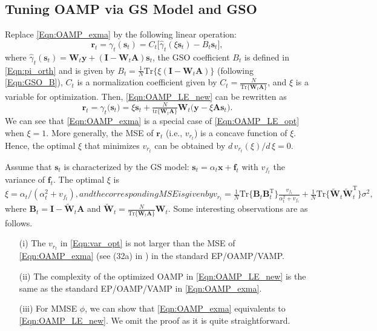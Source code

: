 \documentclass[journal]{IEEEtran}
\newcommand{\mr}{\mathrm}
\newcommand{\BE}{\begin{equation}}
\newcommand{\EE}{\end{equation}}
\newcommand{\BS}{\begin{subequations}}
\newcommand{\ES}{\end{subequations}}
\renewcommand{\bf}{\bm}
\begin{document}
{\color{black}\subsection{Tuning OAMP via GS Model and GSO} 
Replace \eqref{Eqn:OAMP_exma} by the following linear operation:
\BE\label{Eqn:OAMP_LE_new}
  \bf{{r}}_t={\gamma}_t(\bf{{s}}_t) = C_t\big[\hat{\gamma}_t( \xi\bf{{s}}_t) -  B_t \bf{{s}}_t\big], 
\EE
where $ \hat{\gamma}_t(\bf{{s}}_t)=\bf{W}_{\!t}\bf{y} + (\bf{I} - \bf{W}_{\!t}\bf{A})\bf{s}_t$, the GSO coefficient $B_t$ is defined in \eqref{Eqn:pi_orth} and is given by $B_t=\tfrac{1}{N}{\mr{Tr}\{\xi (\bf{I} - \bf{{W}}_t\bf{A})\}}$ (following \eqref{Eqn:GSO_B}), $C_t$ is a normalization coefficient given by $ C_t= \tfrac{N}{\mr{Tr}\{\bf{{W}}_t\bf{A}\}}$, and $\xi$ is a variable for optimization. Then, \eqref{Eqn:OAMP_LE_new} can be rewritten as
\BE\label{Eqn:OAMP_LE_opt}
\bf{{r}}_t={\gamma}_t\big(\bf{{s}}_t)=\xi\bf{{s}}_t+ \tfrac{N}{\mr{tr}\{\bf{{W}}_t\bf{A}\}}{\bf{W}}_t(\bf{y}-\xi\bf{A}\bf{{s}}_t\big).
\EE
 We can see that \eqref{Eqn:OAMP_exma} is a special case of \eqref{Eqn:OAMP_LE_opt} when $\xi=1$. More generally, the MSE of $\bf{{r}}_t$ (i.e., $v_{r_t}$) is a concave function of $\xi$. Hence, the optimal $\xi$ that minimizes $v_{r_t}$ can be obtained by $d\,v_{r_t}(\xi)/d\,\xi=0$. 

Assume that ${\bm s}_t$ is characterized by the GS model: ${\bm s}_t={\alpha_t}{\bm x}+{\bm f}_t$ with $v_{f_t}$ the variance of ${\bm f}_t$. The optimal $\xi$ is
\BS\BE
\xi= \alpha_t/(\alpha_t^2+v_{f_t}),
\EE
and the corresponding MSE is given by
\BE\label{Eqn:var_opt}
v_{r_t} = \tfrac{1}{N}\mr{Tr}\{\bf{B}_t\bf{B}_t^{\mr{T}}\}\tfrac{v_{f_t}}{\alpha_t^2+v_{f_t}}  +\tfrac{1}{N}\mr{Tr}\{\tilde{\bf{W}}_t\tilde{\bf{W}}_t^{\mr{T}}\}\sigma^2,
\EE\ES
where $\bf{B}_t=\bf{I}-\tilde{\bf{W}}_t\bf{A}$ and $\tilde{\bf{W}}_t=\tfrac{N}{\mr{Tr}\{\bf{{W}}_t\bf{A}\}}\bf{W}_{\!t}$. Some interesting observations are as follows.
\begin{itemize}
\item[(i)]  The $v_{r_t} $ in \eqref{Eqn:var_opt} is not larger than the MSE of \eqref{Eqn:OAMP_exma} (see (32a) in \cite{Ma2016}) in the standard EP/OAMP/VAMP. 

\item[(ii)]  The complexity of the optimized OAMP in \eqref{Eqn:OAMP_LE_new} is the same as the standard EP/OAMP/VAMP in \eqref{Eqn:OAMP_exma}.

\item[(iii)] For MMSE $\hat{\phi}$, we can show that \eqref{Eqn:OAMP_exma} equivalents to \eqref{Eqn:OAMP_LE_new}. We omit the proof as it is quite straightforward.  %


\end{itemize}}
\end{document}
